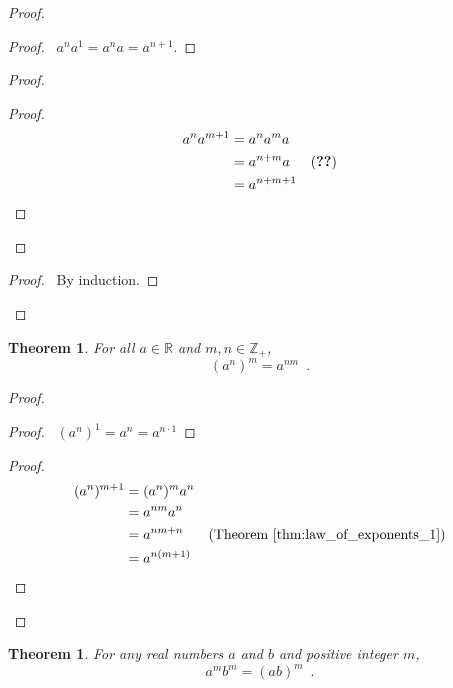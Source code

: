 \documentclass{book}
\let\qed\relax
\newtheorem{thm}[ax]{Theorem}
\theoremstyle{definition}
\begin{document}
\begin{proof}
\pf
{}
\begin{proof}
	\pf\ $a^n a^1 = a^n a = a^{n+1}$.
\end{proof}
\begin{proof}
	\begin{proof}
		\pf
		\begin{align*}
			a^n a^{m+1} & = a^n a^m a \\
			& = a^{n+m} a & (\text{\stepref{b}}) \\
			& = a^{n+m+1}
		\end{align*}
	\end{proof}
\end{proof}
\qedstep
\begin{proof}
	\pf\ By induction.
\end{proof}
\qed
\end{proof}

\begin{thm}
For all $a \in \mathbb{R}$ and $m,n \in \mathbb{Z}_+$,
\[ (a^n)^m = a^{nm} \enspace . \]
\end{thm}

\begin{proof}
\pf
{}
\begin{proof}
	\pf\ $(a^n)^1 = a^n = a^{n \cdot 1}$
\end{proof}
\begin{proof}
	\pf
	\begin{align*}
		(a^n)^{m+1} & = (a^n)^m a^n \\
		& = a^{nm} a^n \\
		& = a^{nm+n} & (\text{Theorem \ref{thm:law_of_exponents_1}}) \\
		& = a^{n(m+1)}
	\end{align*}
\end{proof}
\qed
\end{proof}

\begin{thm}
For any real numbers $a$ and $b$ and positive integer $m$,
\[ a^m b^m = (ab)^m \enspace . \]
\end{thm}
\end{document}

